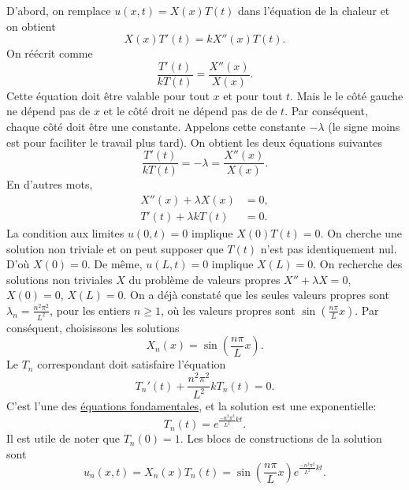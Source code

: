 D'abord, on remplace $u(x,t) = X(x)T(t)$ dans l'équation de la chaleur et on obtient
\begin{equation*}
X(x)T'(t) = k X''(x)T(t) .
\end{equation*}
On réécrit comme
\begin{equation*}
\frac{T'(t)}{k T(t)} =
\frac{X''(x)}{X(x)} .
\end{equation*}
Cette équation doit être valable pour tout $ x $ et pour tout $ t $.  Mais le
le côté gauche ne dépend pas de $ x $ et le côté droit ne dépend pas de
de $ t $.  Par conséquent,  chaque côté doit être une constante.  Appelons cette
constante $-\lambda$ (le signe moins est pour faciliter le travail plus tard).
On obtient les deux équations suivantes
\begin{equation*}
\frac{T'(t)}{k T(t)} = -\lambda =
\frac{X''(x)}{X(x)} .
\end{equation*}
En d'autres mots,
\begin{align*}
X''(x) + \lambda X(x) &= 0 , \\
T'(t) + \lambda k T(t) &= 0 .
\end{align*}
La condition aux limites $ u (0, t) = 0 $ implique $ X (0) T (t) = 0 $.  On cherche
une solution non triviale et on peut supposer que $ T (t) $ n'est pas identiquement nul.  D'où $ X (0) = 0 $.  De même, $ u (L, t) = 0 $ implique $ X (L) = 0 $.  On
recherche des solutions non triviales $ X $ du problème de valeurs propres
$X'' + \lambda X = 0$, $X(0) = 0$, $X(L) = 0$.  
On a déjà constaté que les seules valeurs propres sont $\lambda_n = \frac{n^2 \pi^2}{L^2}$,  pour les entiers 
$n \geq 1$,
où les valeurs propres sont $\sin \left(\frac{n \pi}{L} x\right)$.  Par conséquent, choisissons
les solutions
\begin{equation*}
X_n (x) = \sin \left(\frac{n \pi}{L} x \right) .
\end{equation*}
Le $ T_n $ correspondant doit satisfaire l'équation
\begin{equation*}
T_n'(t) + \frac{n^2 \pi^2}{L^2} k T_n(t) = 0 .
\end{equation*}
C'est l'une des
\hyperref[subsection:fourfundamental]{équations fondamentales},
et la solution est une exponentielle:
\begin{equation*}
T_n(t) = e^{\frac{-n^2 \pi^2}{L^2} k t} .
\end{equation*}
Il est utile de noter que $T_n(0) = 1$.
Les blocs de constructions de la solution sont
\begin{equation*}
u_n(x,t) = X_n(x)T_n(t) =
\sin \left( \frac{n \pi}{L} x \right)
e^{\frac{-n^2 \pi^2}{L^2} k t} .
\end{equation*}

